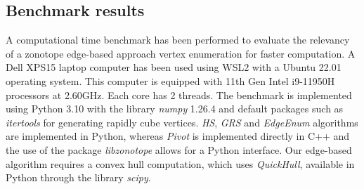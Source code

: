 

\subsection{Benchmark results}
\label{subsec:benchmark_results}
A computational time benchmark has been performed to evaluate the relevancy of a zonotope edge-based approach vertex enumeration for faster computation. A Dell XPS15 laptop computer has been used using WSL2 with a Ubuntu 22.01 operating system. This computer is equipped with 11th Gen Intel i9-11950H processors at 2.60GHz. Each core has 2 threads. The benchmark is implemented using Python 3.10 with the library \emph{numpy} 1.26.4 and default packages such as \emph{itertools} for generating rapidly cube vertices. \emph{HS}, \emph{GRS} and \emph{EdgeEnum} algorithms are implemented in Python, whereas \emph{Pivot} is implemented directly in C++ and the use of the package \emph{libzonotope} allows for a Python interface. Our edge-based algorithm requires a convex hull computation, which uses \emph{QuickHull}, available in Python through the library \emph{scipy}. 


